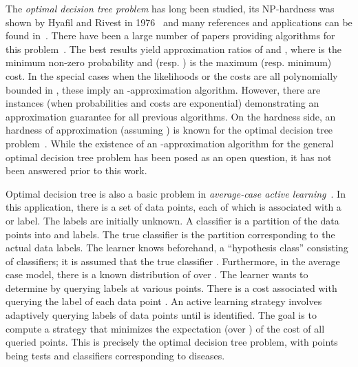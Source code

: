 \documentclass[11pt]{article}
\def\dtp{optimal decision tree problem\xspace}
\begin{document}
The \emph{\dtp} has long been studied, its NP-hardness was shown by Hyafil and Rivest in 1976~\cite{rivest-hyafil}  and
many references and applications can be found in~\cite{N11}. 
There have been a large number of papers providing algorithms for this problem~\cite{garey-graham,loveland,kmb,dasgupta,AH12,CPRAM11,N11,gb09}. The best results yield approximation ratios of  and , where  is the minimum non-zero probability and  (resp. ) is the maximum (resp. minimum) cost. In the special cases when the likelihoods  or the costs
 are all polynomially bounded in , these imply an -approximation
algorithm. However, there are instances (when probabilities and costs are exponential) demonstrating an  approximation guarantee for all previous algorithms. On the hardness side, an  hardness of approximation (assuming ) is known for the \dtp~\cite{CPRAM11}. 
While the existence of an -approximation algorithm for the general \dtp has been posed as an open question,
it has not been answered prior to this work.
 


Optimal decision tree is also a basic problem in {\em average-case active learning}~\cite{dasgupta,N11,gb09}. In this
application, there is a set of  data points, each of which is associated with a  or  label. The labels are
initially unknown. A classifier is a partition of the data points into  and  labels. The true classifier  is
the partition corresponding to the actual data labels. The learner knows beforehand, a ``hypothesis class'' 
consisting of  classifiers; it is assumed that the true classifier . Furthermore, in the average case
model, there is a known distribution  of  over . The learner wants to determine  by querying labels
at various points. There is a cost  associated with querying the label of each data point . An active learning
strategy involves adaptively querying labels of data points until  is identified. The goal is to compute a
strategy that minimizes the expectation (over ) of the cost of all queried points. This is precisely the \dtp,
with points being tests and classifiers corresponding to diseases.
\end{document}
